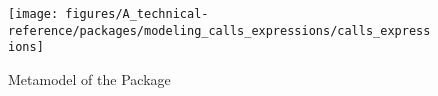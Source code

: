 %
%


\begin{figure}[htbp]
  \centering
  \texttt{[image: figures/A\_technical-reference/packages/modeling\_calls\_expressions/calls\_expressions]}
  \caption{Metamodel of the  Package}
  \label{fig:MM:calls:expressions}
\end{figure}